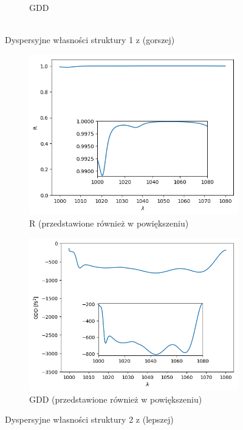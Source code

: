 \begin{figure}
\begin{subfigure}[b]{0.49\textwidth}
        \caption{GDD\\~}
    \end{subfigure}
    \caption[Dyspersyjne własności struktury 1 (gorszej)]{Dyspersyjne własności struktury 1 z \cite{dbr1} (gorszej)}
    \label{fig:dbr1}
\end{figure}

\begin{figure}
    \centering
    \begin{subfigure}[b]{0.46\textwidth}
        \includegraphics[width=\linewidth]{figures/funkcjacelu/result_Rdbr_opt.png}
        \caption{R (przedstawione również w powiększeniu)}
    \end{subfigure}
       \begin{subfigure}[b]{0.49\textwidth}
        \includegraphics[width=\linewidth]{figures/funkcjacelu/result_gdddbr_opt.png}
        \caption{GDD (przedstawione również w powiększeniu)}
    \end{subfigure}
    \caption[Dyspersyjne własności struktury 2 (lepszej)]{Dyspersyjne własności struktury 2 z \cite{dbr2} (lepszej)}
    \label{fig:dbr2}
\end{figure}

